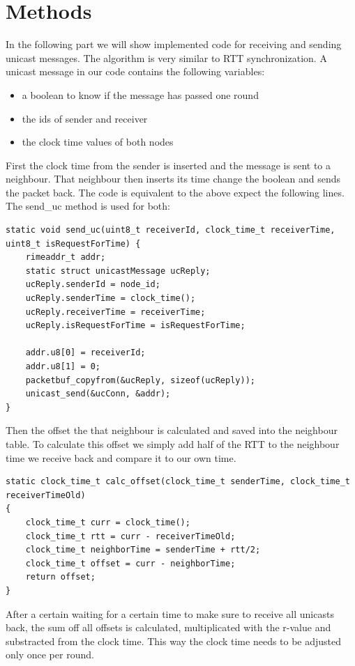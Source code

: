 \documentclass{llncs}
\begin{document}
\section{Methods}
In the following part we will show implemented code for receiving and sending unicast messages. The algorithm is very similar to RTT synchronization. A unicast message in our code contains the following variables:
\begin{itemize}
	\item a boolean to know if the message has passed one round
	\item the ids of sender and receiver
	\item the clock time values of both nodes
\end{itemize}
First the clock time from the sender is inserted and the message is sent to a neighbour. That neighbour then inserts its time change the boolean and sends the packet back. The code is equivalent to the above expect the following lines. The send\_uc method is used for both: 

\begin{lstlisting}
static void send_uc(uint8_t receiverId, clock_time_t receiverTime, uint8_t isRequestForTime) {
	rimeaddr_t addr;
	static struct unicastMessage ucReply;
	ucReply.senderId = node_id;
	ucReply.senderTime = clock_time();
	ucReply.receiverTime = receiverTime;
	ucReply.isRequestForTime = isRequestForTime;

	addr.u8[0] = receiverId;
	addr.u8[1] = 0;
	packetbuf_copyfrom(&ucReply, sizeof(ucReply));
	unicast_send(&ucConn, &addr);
}
\end{lstlisting}

 Then the offset the that neighbour is calculated and saved into the neighbour table. To calculate this offset we simply add half of the RTT to the neighbour time we receive back and compare it to our own time. 

\begin{lstlisting}
static clock_time_t calc_offset(clock_time_t senderTime, clock_time_t receiverTimeOld)
{
    clock_time_t curr = clock_time();
    clock_time_t rtt = curr - receiverTimeOld;
    clock_time_t neighborTime = senderTime + rtt/2;
    clock_time_t offset = curr - neighborTime;
    return offset;
}
\end{lstlisting}

After a certain waiting for a certain time to make sure to receive all unicasts back, the sum off all offsets is calculated, multiplicated with the r-value and substracted from the clock time. This way the clock time needs to be adjusted only once per round.
\end{document}
